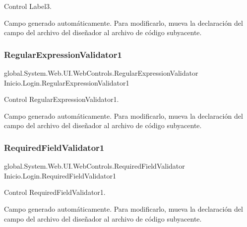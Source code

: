 Control Label3. 

Campo generado automáticamente. Para modificarlo, mueva la declaración del campo del archivo del diseñador al archivo de código subyacente. \mbox{\label{classInicio_1_1Login_aebbbf7080d71a07e72e4be45e42c6795}} 
\subsubsection{\texorpdfstring{RegularExpressionValidator1}{RegularExpressionValidator1}}
{\footnotesize\ttfamily global.\+System.\+Web.\+U\+I.\+Web\+Controls.\+Regular\+Expression\+Validator Inicio.\+Login.\+Regular\+Expression\+Validator1\hspace{0.3cm}{\ttfamily [protected]}}



Control Regular\+Expression\+Validator1. 

Campo generado automáticamente. Para modificarlo, mueva la declaración del campo del archivo del diseñador al archivo de código subyacente. \mbox{\label{classInicio_1_1Login_ab86e1edc9ca75591b9305e7c152beb95}} 
\subsubsection{\texorpdfstring{RequiredFieldValidator1}{RequiredFieldValidator1}}
{\footnotesize\ttfamily global.\+System.\+Web.\+U\+I.\+Web\+Controls.\+Required\+Field\+Validator Inicio.\+Login.\+Required\+Field\+Validator1\hspace{0.3cm}{\ttfamily [protected]}}



Control Required\+Field\+Validator1. 

Campo generado automáticamente. Para modificarlo, mueva la declaración del campo del archivo del diseñador al archivo de código subyacente. \mbox{\label{classInicio_1_1Login_a072466936abf9e49afe63fb3874ddee6}} 
